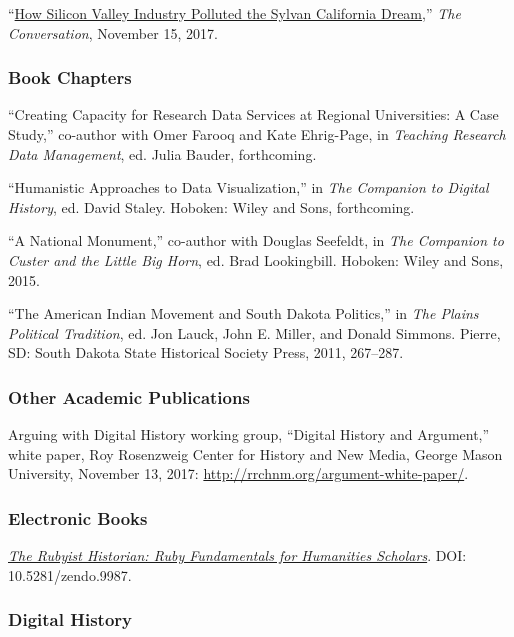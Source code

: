 ``\href{https://theconversation.com/how-silicon-valley-industry-polluted-the-sylvan-california-dream-85810}{How
Silicon Valley Industry Polluted the Sylvan California Dream},''
\emph{The Conversation}, November 15, 2017.

\subsubsection{Book Chapters}\label{book-chapters}

``Creating Capacity for Research Data Services at Regional Universities:
A Case Study,'' co-author with Omer Farooq and Kate Ehrig-Page, in
\emph{Teaching Research Data Management}, ed. Julia Bauder, forthcoming.

``Humanistic Approaches to Data Visualization,'' in \emph{The Companion
to Digital History}, ed. David Staley. Hoboken: Wiley and Sons,
forthcoming.

``A National Monument,'' co-author with Douglas Seefeldt, in \emph{The
Companion to Custer and the Little Big Horn}, ed. Brad Lookingbill.
Hoboken: Wiley and Sons, 2015.

``The American Indian Movement and South Dakota Politics,'' in \emph{The
Plains Political Tradition}, ed. Jon Lauck, John E. Miller, and Donald
Simmons. Pierre, SD: South Dakota State Historical Society Press, 2011,
267--287.

\subsubsection{Other Academic
Publications}\label{other-academic-publications}

Arguing with Digital History working group, ``Digital History and
Argument,'' white paper, Roy Rosenzweig Center for History and New
Media, George Mason University, November 13, 2017:
\url{http://rrchnm.org/argument-white-paper/}.

\subsubsection{Electronic Books}\label{electronic-books}

\emph{\href{http://hepplerj.github.io/rubyist-historian/}{The Rubyist
Historian: Ruby Fundamentals for Humanities Scholars}}. DOI:
10.5281/zendo.9987.

\subsubsection{Digital History}\label{digital-history}

